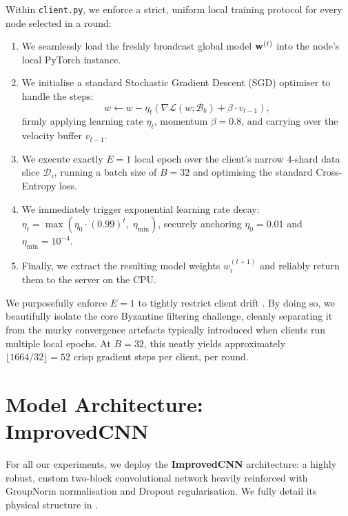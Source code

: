 \documentclass[../main.tex]{subfiles}
\begin{document}
Within \texttt{client.py}, we enforce a strict, uniform local training protocol for every node selected in a round:
\begin{enumerate}
    \item We seamlessly load the freshly broadcast global model $\mathbf{w}^{(t)}$ into the node's local PyTorch instance.
    \item We initialise a standard Stochastic Gradient Descent (SGD) optimiser to handle the steps:
    \begin{equation}
        w \leftarrow w - \eta_t \left(\nabla \mathcal{L}(w; \mathcal{B}_b) + \beta \cdot v_{t-1}\right),
        \label{eq:sgd_update}
    \end{equation}
    firmly applying learning rate $\eta_t$, momentum $\beta = 0.8$, and carrying over the velocity buffer $v_{t-1}$.
    \item We execute exactly $E = 1$ local epoch over the client's narrow 4-shard data slice $\mathcal{D}_i$, running a batch size of $B = 32$ and optimising the standard Cross-Entropy loss.
    \item We immediately trigger exponential learning rate decay: $\eta_t = \max(\eta_0 \cdot (0.99)^t,\; \eta_{\min})$, securely anchoring $\eta_0 = 0.01$ and $\eta_{\min} = 10^{-4}$.
    \item Finally, we extract the resulting model weights $w_i^{(t+1)}$ and reliably return them to the server on the CPU.
\end{enumerate}

We purposefully enforce $E = 1$ to tightly restrict client drift \citep{kairouz2021advances}. By doing so, we beautifully isolate the core Byzantine filtering challenge, cleanly separating it from the murky convergence artefacts typically introduced when clients run multiple local epochs. At $B = 32$, this neatly yields approximately $\lfloor 1664 / 32 \rfloor = 52$ crisp gradient steps per client, per round.

\section{Model Architecture: ImprovedCNN}
\label{sec:exp_model}

For all our experiments, we deploy the \textbf{ImprovedCNN} architecture: a highly robust, custom two-block convolutional network heavily reinforced with GroupNorm normalisation and Dropout regularisation. We fully detail its physical structure in .
\end{document}
